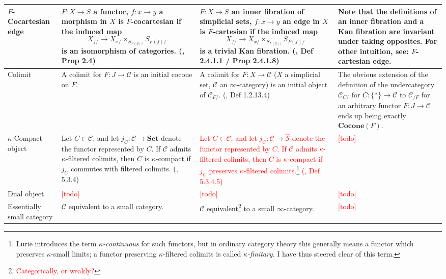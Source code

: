 \documentclass{article}
\def\textcolour{\textcolor}
\begin{document}
\begin{centre}
\begin{longtable}{ |p{3.2cm}||p{5cm}|p{5.2cm}|p{5cm}|  }
 \hline
 \(F\)-Cocartesian edge & \(F : X \to S \) a functor, \(f : x\to y \) a morphism in \(X\) is \(F\)-cocartesian if the induced map \[X_{f/}\to X_{x/}\times_{S_{F(y)/}}S_{F(f)/}\] is an isomorphism of categories. (\autocite{cartesian}, Prop 2.4) & \(F : X \to S \) an inner fibration of simplicial sets, \(f : x\to y \) an edge in \(X\) is \(F\)-cartesian if the induced map \[X_{f/}\to X_{x/}\times_{S_{F(y)/}}S_{F(f)/}\] is a trivial Kan fibration. (\autocite{htt}, Def 2.4.1.1 / Prop 2.4.1.8)& Note that the definitions of an inner fibration and a Kan fibration are invariant under taking opposites. For other intuition, see: \(F\)-cartesian edge. \\
\hline
 Colimit & A colimit for \(F : J \to \mathcal{C}\) is an initial cocone on \(F\). & A colimit for \(F : X\to \mathcal{C} \) (\(X\) a simplicial set, \(\mathcal{C}\) an \(\infty\)-category) is an initial object of \(\mathcal{C}_{F/}\). (\autocite{htt}, Def 1.2.13.4) & The obvious extension of the definition of the undercategory \(\mathcal{C}_{C/}\) for \(C : \{*\} \to \mathcal{C}\) to \(\mathcal{C}_{/F}\)  for an arbitrary functor \(F : J \to \mathcal{C}\) ends up being exactly \(\textbf{Cocone}(F)\). \\
\hline
\(\kappa\)-Compact object & Let \(C \in \mathcal{C}\), and let \(j_C : \mathcal{C} \to \textbf{Set}\) denote the functor represented by \(C\). If \(\mathcal{C}\) admits \(\kappa\)-filtered colimits, then \(C\) is \(\kappa\)-compact if \(j_C\) commutes with filtered colimits. (\autocite{htt}, 5.3.4) & \textcolour{red}{Let \(C \in \mathcal{C}\), and let \(j_C : \mathcal{C} \to \hat{\mathcal{S}}\) denote the functor represented by \(C\). If \(\mathcal{C}\) admits \(\kappa\)-filtered colimits, then \(C\) is \(\kappa\)-compact if \(j_C\) preserves \(\kappa\)-filtered colimits.\footnote{Lurie introduces the term \textit{\(\kappa\)-continuous} for such functors, but in ordinary category theory this generally means a functor which preserves \(\kappa\)-small limits; a functor preserving \(\kappa\)-filtered colimits is called \textit{\(\kappa\)-finitary}. I have thus steered clear of this term.} (\autocite{htt}, Def 5.3.4.5)} & \textcolour{red}{[todo]}\\
\hline
Dual object & \textcolour{red}{[todo]} & \textcolour{red}{[todo]} & \textcolour{red}{[todo]}\\
\hline
Essentially small category & \(\mathcal{C}\) equivalent to a small category. & \(\mathcal{C}\) equivalent\footnote{\textcolour{red}{Categorically, or weakly?}} to a small \(\infty\)-category. & \textcolour{red}{[todo]}\\

\end{longtable}
\end{centre}
\end{document}
